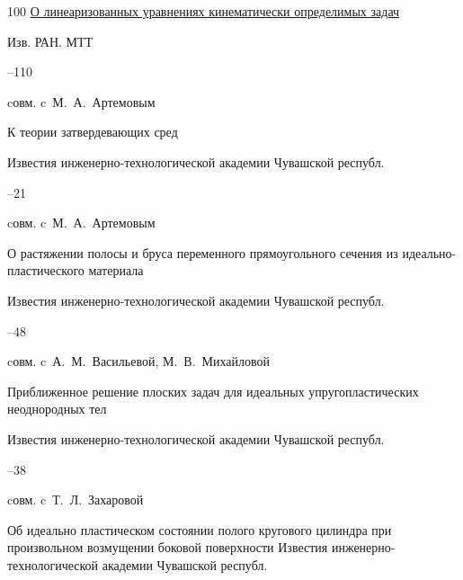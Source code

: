 \begin{thebibliography}{100}
\paper \href{http://elibrary.ru/item.asp?id=26054943}{О линеаризованных уравнениях кинематически определимых задач}

\jour Изв. РАН. МТТ




–110 

\miscnote cовм. c~М.~А.~Артемовым




\paper К теории затвердевающих сред 

\jour Известия инженерно-технологической академии Чувашской республ.



–21

\miscnote cовм. c~М.~А.~Артемовым




\paper О растяжении полосы и бруса переменного прямоугольного сечения из идеально-пластического материала 

\jour Известия инженерно-технологической академии Чувашской республ.



–48 

\miscnote cовм. c~А.~М.~Васильевой, М.~В.~Михайловой




\paper Приближенное решение плоских задач для идеальных упругопластических неоднородных тел 

\jour Известия инженерно-технологической академии Чувашской республ.



–38 

\miscnote cовм. c~Т.~Л.~Захаровой




\paper Об идеально пластическом состоянии полого кругового цилиндра при произвольном возмущении боковой поверхности \jour Известия инженерно-технологической академии Чувашской республ.



\end{thebibliography}
